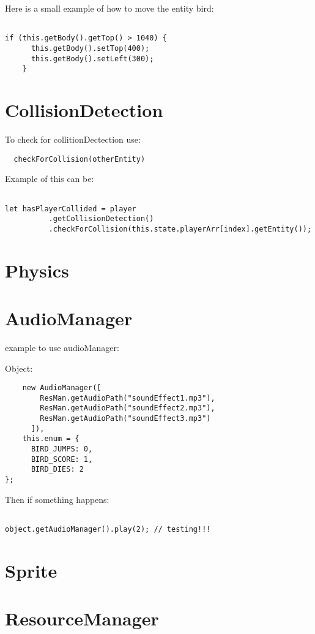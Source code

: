 Here is a small example of how to move the entity bird:
\begin{lstlisting}

if (this.getBody().getTop() > 1040) {
      this.getBody().setTop(400);
      this.getBody().setLeft(300);
    }
\end{lstlisting}

\section{CollisionDetection}
To check for collitionDectection use:
\begin{lstlisting}
  checkForCollision(otherEntity)
\end{lstlisting}

Example of this can be:
\begin{lstlisting}

let hasPlayerCollided = player
          .getCollisionDetection()
          .checkForCollision(this.state.playerArr[index].getEntity());
\end{lstlisting}


\section{Physics}

\section{AudioManager}
example to use audioManager:

Object:
\begin{lstlisting}
    new AudioManager([
        ResMan.getAudioPath("soundEffect1.mp3"),
        ResMan.getAudioPath("soundEffect2.mp3"),
        ResMan.getAudioPath("soundEffect3.mp3")
      ]),    
    this.enum = {
      BIRD_JUMPS: 0,
      BIRD_SCORE: 1,
      BIRD_DIES: 2
};
\end{lstlisting}

Then if something happens:
\begin{lstlisting}

object.getAudioManager().play(2); // testing!!!
\end{lstlisting}


\section{Sprite}
\section{ResourceManager}

